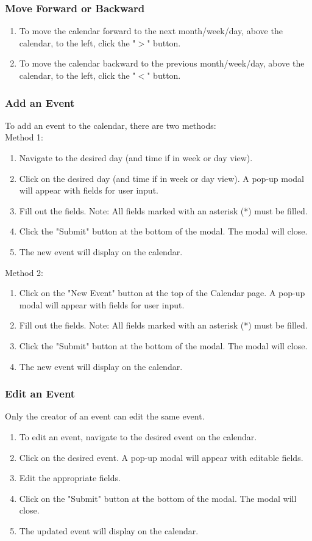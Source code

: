 \documentclass[12pt]{article}
\begin{document}
\subsubsection{Move Forward or Backward}
\begin{enumerate}
\item To move the calendar forward to the next month/week/day,  above the calendar, to the left, click the "$>$" button.
\item To move the calendar backward to the previous month/week/day,  above the calendar, to the left, click the "$<$" button.
\end{enumerate}

\subsubsection{Add an Event}
To add an event to the calendar, there are two methods: \\
Method 1: 
\begin{enumerate}
\item Navigate to the desired day (and time if in week or day view).
\item Click on the desired day (and time if in week or day view). A pop-up modal will appear with fields for user input.
\item Fill out the fields. Note: All fields marked with an asterisk (*) must be filled.
\item Click the "Submit" button at the bottom of the modal. The modal will close.
\item The new event will display on the calendar.
\end{enumerate}
Method 2:
\begin{enumerate}
\item Click on the "New Event" button at the top of the Calendar page. A pop-up modal will appear with fields for user input. 
\item Fill out the fields. Note: All fields marked with an asterisk (*) must be filled.
\item Click the "Submit" button at the bottom of the modal. The modal will close.
\item The new event will display on the calendar.
\end{enumerate}

\subsubsection{Edit an Event}
Only the creator of an event can edit the same event. 
\begin{enumerate}
\item To edit an event, navigate to the desired event on the calendar. 
\item Click on the desired event. A pop-up modal will appear with editable fields.
\item Edit the appropriate fields.
\item Click on the "Submit" button at the bottom of the modal. The modal will close.
\item The updated event will display on the calendar.
\end{enumerate}
\end{document}
